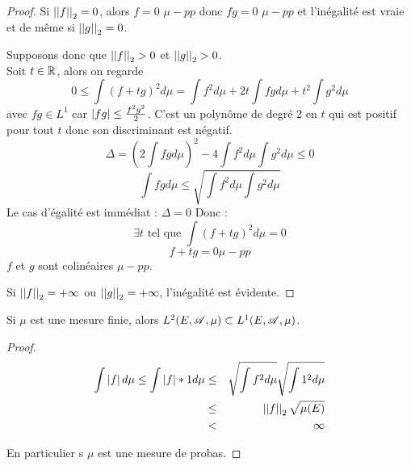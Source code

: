 \begin{proof}
	Si $\left|\left|f\right|\right|_2 = 0$, alors $f = 0$ $\mu-pp$ donc $fg = 0$ $\mu-pp$ et l'inégalité est vraie et de
	même si $\left|\left|g\right|\right|_2 = 0$.

	Supposons donc que $\left|\left|f\right|\right|_2 > 0$ et $\left|\left|g\right|\right|_2 > 0$.\\
	Soit $t \in \mathbb{R}$, alors on regarde
	$$ 0 \leq \int (f + tg)^2 d \mu = \int f^2 d \mu + 2t \int fg d \mu + t^2 \int g^2 d \mu$$
	avec $fg \in L^1$ car $\left|fg\right| \leq \frac{f^2g^2}{2}$.
	C'est un polynôme de degré 2 en $t$ qui est positif pour tout $t$ donc son discriminant est négatif.
	$$  \Delta = (2 \int fg d \mu)^2 - 4 \int f^2 d \mu \int g^2 d \mu \leq 0$$
	$$ \int fg d \mu \leq \sqrt{\int f^2 d \mu \int g^2 d \mu}$$
	Le cas d'égalité est immédiat : $\Delta = 0$ Donc :
	$$\exists t \text { tel que } \int (f + tg)^2 d \mu  = 0$$
	$$ f + tg = 0  \mu-pp$$
	$f$ et $g$ sont colinéaires $\mu-pp$.

	Si $\left|\left|f\right|\right|_2 = +  \infty$ ou $\left|\left|g\right|\right|_2 = +  \infty$, l'inégalité est évidente.
\end{proof}

\begin{coro}
	Si $\mu$ est une mesure finie, alors $L^2(E, \mathscr{A}, \mu) \subset L^1(E, \mathscr{A}, \mu)$.
\end{coro}

\begin{proof}
	\begin{eqnarray*}
		\int \left|f\right| d \mu \leq \int \left|f\right|*1 d \mu &\leq& \sqrt{\int f^2 d \mu} \sqrt{\int 1^2 d \mu} \\
		& \leq & \left|\left|f\right|\right|_2 \sqrt{\mu(E)} \\
		& < & \infty
	\end{eqnarray*}

	En particulier s $\mu$ est une mesure de probas.
\end{proof}



